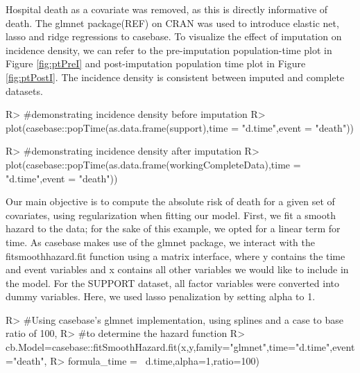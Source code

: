 \documentclass[
]{jss}
\begin{document}
Hospital death as a covariate was removed, as this is directly
informative of death. The glmnet package(REF) on CRAN was used to
introduce elastic net, lasso and ridge regressions to casebase. To
visualize the effect of imputation on incidence density, we can refer to
the pre-imputation population-time plot in Figure \ref{fig:ptPreI} and
post-imputation population time plot in Figure \ref{fig:ptPostI}. The
incidence density is consistent between imputed and complete datasets.

\begin{CodeChunk}

\begin{CodeInput}
R> #demonstrating incidence density before imputation
R> plot(casebase::popTime(as.data.frame(support),time = "d.time",event = "death"))
\end{CodeInput}
\end{CodeChunk}

\begin{CodeChunk}

\begin{CodeInput}
R> #demonstrating incidence density after imputation
R> plot(casebase::popTime(as.data.frame(workingCompleteData),time = "d.time",event = "death"))
\end{CodeInput}
\end{CodeChunk}

Our main objective is to compute the absolute risk of death for a given
set of covariates, using regularization when fitting our model. First,
we fit a smooth hazard to the data; for the sake of this example, we
opted for a linear term for time. As casebase makes use of the glmnet
package, we interact with the fitsmoothhazard.fit function using a
matrix interface, where y contains the time and event variables and x
contains all other variables we would like to include in the model. For
the SUPPORT dataset, all factor variables were converted into dummy
variables. Here, we used lasso penalization by setting alpha to 1.

\begin{CodeChunk}

\begin{CodeInput}
R> #Using casebase's glmnet implementation, using splines and a case to base ratio of 100,
R> #to determine the hazard function
R> cb.Model=casebase::fitSmoothHazard.fit(x,y,family="glmnet",time="d.time",event="death",
R>                              formula_time = ~d.time,alpha=1,ratio=100)
\end{CodeInput}
\end{CodeChunk}
\end{document}

